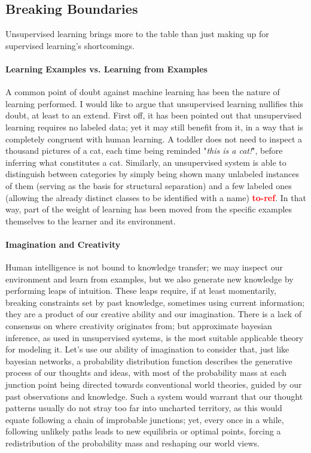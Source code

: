 \documentclass[]{article}
\newcommand\toref{\textcolor{red}{\bf{to-ref}}}
\begin{document}
\subsection{Breaking Boundaries}
Unsupervised learning brings more to the table than just making up for supervised learning's shortcomings. 

\paragraph{Learning Examples vs. Learning from Examples} A common point of doubt against machine learning has been the nature of learning performed. I would like to argue that unsupervised learning nullifies this doubt, at least to an extend. First off, it has been pointed out that unsupervised learning requires no labeled data; yet it may still benefit from it, in a way that is completely congruent with human learning. A toddler does not need to inspect a thousand pictures of a cat, each time being reminded "\textit{this is a cat!}", before inferring what constitutes a cat. Similarly, an unsupervised system is able to distinguish between categories by simply being shown many unlabeled instances of them (serving as the basis for structural separation) and a few labeled ones (allowing the already distinct classes to be identified with a name) \toref . In that way, part of the weight of learning has been moved from the specific examples themselves to the learner and its environment.

\paragraph{Imagination and Creativity} Human intelligence is not bound to knowledge transfer; we may inspect our environment and learn from examples, but we also generate new knowledge by performing leaps of intuition. These leaps require, if at least momentarily, breaking constraints set by past knowledge, sometimes using current information; they are a product of our creative ability and our imagination. There is a lack of consensus on where creativity originates from; but approximate bayesian inference, as used in unsupervised systems, is the most suitable applicable theory for modeling it. Let's use our ability of imagination to consider that, just like bayesian networks, a  probability distribution function describes the generative process of our thoughts and ideas, with most of the probability mass at each junction point being directed towards conventional world theories, guided by our past observations and knowledge. Such a system would warrant that our thought patterns usually do not stray too far into uncharted territory, as this would equate following a chain of improbable junctions; yet, every once in a while, following unlikely paths leads to new equilibria or optimal points, forcing a redistribution of the probability mass and reshaping our world views.
\end{document}
